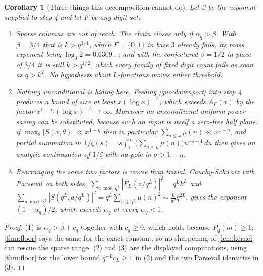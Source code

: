 \documentclass[11pt]{amsart}
\newtheorem{corollary}[theorem]{Corollary}
\theoremstyle{definition}
\theoremstyle{remark}
\begin{document}
\begin{corollary}[Three things this decomposition cannot do]
\label{cor:walls}
Let $\beta$ be the exponent supplied to step 4 and let $F$ be any digit set.
\begin{enumerate}
  \item \emph{Sparse columns are out of reach.} The chain closes only if $\alpha_q > \beta$. With $\beta = 3/4$ that is $k > q^{3/4}$, which $F = \{0,1\}$ in base $3$ already fails, its mass exponent being $\log_3 2 = 0.6309\ldots$; and with the conjectured $\beta = 1/2$ in place of $3/4$ it is still $k > q^{1/2}$, which every family of fixed digit count fails as soon as $q > k^2$. No hypothesis about $L$-functions moves either threshold.
  \item \emph{Nothing unconditional is hiding here.} Feeding \cref{quo:davenport} into step 4 produces a bound of size at least $x(\log x)^{-A}$, which exceeds $A_F(x)$ by the factor $x^{1-\alpha_q}(\log x)^{-A} \to \infty$. Moreover no unconditional uniform power saving can be substituted, because such an input is itself a zero-free half plane: if $\max_\theta |S(x,\theta)| \ll x^{1-\eta}$ then in particular $\sum_{n \le x} \mu(n) \ll x^{1-\eta}$, and partial summation in $1/\zeta(s) = s \int_1^\infty \bigl(\sum_{n \le u} \mu(n)\bigr) u^{-s-1}\,du$ then gives an analytic continuation of $1/\zeta$ with no pole in $\sigma > 1 - \eta$.
  \item \emph{Rearranging the same two factors is worse than trivial.} Cauchy-Schwarz with Parseval on both sides, $\sum_{a \bmod q^L} |\widehat F_L(a/q^L)|^2 = q^L k^L$ and $\sum_{a \bmod q^L} |S(q^L, a/q^L)|^2 = q^L \sum_{n \le q^L} \mu(n)^2 \sim \frac{6}{\pi^2} q^{2L}$, gives the exponent $(1 + \alpha_q)/2$, which exceeds $\alpha_q$ at every $\alpha_q < 1$.
\end{enumerate}
\end{corollary}

\begin{proof}
(1) is $\alpha_q > \beta + c_q$ together with $c_q \ge 0$, which holds because $P_q(m) \ge 1$; \cref{thm:floor} says the same for the exact constant, so no sharpening of \cref{lem:kernel} can rescue the sparse range. (2) and (3) are the displayed computations, using \cref{thm:floor} for the lower bound $q^{-L}c_L \ge 1$ in (2) and the two Parseval identities in (3).
\end{proof}
\end{document}
